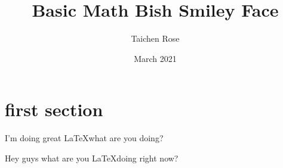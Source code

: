                                                                                                                                                                                                                                                              \documentclass{article}
\title{Basic Math Bish Smiley Face}
\author{Taichen Rose}
\date{March 2021}
\begin{document}
\section{first section}

I'm doing great \LaTeX  what are you doing?

Hey guys what are you \LaTeX  doing right now?
\end{document}

